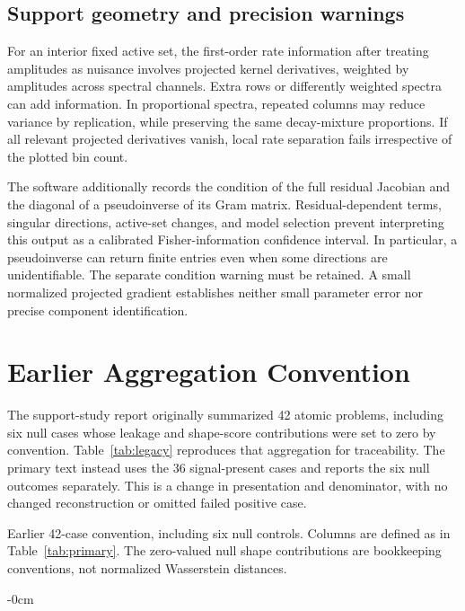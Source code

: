 \subsection{Support geometry and precision warnings}
For an interior fixed active set, the first-order rate information after treating amplitudes as nuisance involves projected kernel derivatives, weighted by amplitudes across spectral channels. Extra rows or differently weighted spectra can add information. In proportional spectra, repeated columns may reduce variance by replication, while preserving the same decay-mixture proportions. If all relevant projected derivatives vanish, local rate separation fails irrespective of the plotted bin count.

The software additionally records the condition of the full residual Jacobian and the diagonal of a pseudoinverse of its Gram matrix. Residual-dependent terms, singular directions, active-set changes, and model selection prevent interpreting this output as a calibrated Fisher-information confidence interval. In particular, a pseudoinverse can return finite entries even when some directions are unidentifiable. The separate condition warning must be retained. A small normalized projected gradient establishes neither small parameter error nor precise component identification.

\section{Earlier Aggregation Convention}\label{app:legacy}
The support-study report originally summarized 42 atomic problems, including six null cases whose leakage and shape-score contributions were set to zero by convention. Table~\ref{tab:legacy} reproduces that aggregation for traceability. The primary text instead uses the 36 signal-present cases and reports the six null outcomes separately. This is a change in presentation and denominator, with no changed reconstruction or omitted failed positive case.
\begin{table}[htbp]
\caption{Earlier 42-case convention, including six null controls. Columns are defined as in Table~\ref{tab:primary}. The zero-valued null shape contributions are bookkeeping conventions, not normalized Wasserstein distances.}\label{tab:legacy}
\begin{adjustwidth}{-\extralength}{0cm}\centering\small

\end{adjustwidth}
\end{table}

